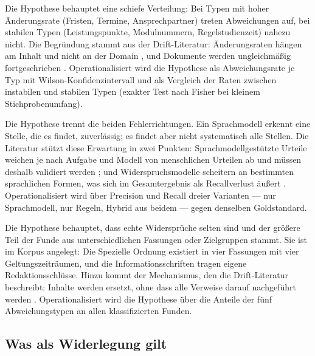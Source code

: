 \begin{description}[style=nextline]
  \item[H1 --- Abweichungen konzentrieren sich auf instabile Sachverhaltstypen]
  Die Hypothese behauptet eine schiefe Verteilung: Bei Typen mit hoher Änderungsrate
  (Fristen, Termine, Ansprechpartner) treten Abweichungen auf, bei stabilen Typen
  (Leistungspunkte, Modulnummern, Regelstudienzeit) nahezu nicht. Die Begründung stammt aus
  der Drift-Literatur: Änderungsraten hängen am Inhalt und nicht an der Domain
  \parencite{fetterly2003}, und Dokumente werden ungleichmäßig fortgeschrieben
  \parencite{jones2016}. Operationalisiert wird die Hypothese als Abweichungsrate je Typ mit
  Wilson-Konfidenzintervall und als Vergleich der Raten zwischen instabilen und stabilen
  Typen (exakter Test nach Fisher bei kleinem Stichprobenumfang).
  \item[H2 --- Sprachmodellgestützte Extraktion ist präzise, aber nicht vollständig]
  Die Hypothese trennt die beiden Fehlerrichtungen. Ein Sprachmodell erkennt eine Stelle, die
  es findet, zuverlässig; es findet aber nicht systematisch alle Stellen. Die Literatur
  stützt diese Erwartung in zwei Punkten: Sprachmodellgestützte Urteile weichen je nach
  Aufgabe und Modell von menschlichen Urteilen ab und müssen deshalb validiert werden
  \parencite{bavaresco2025llms}; und Widerspruchsmodelle scheitern an bestimmten sprachlichen
  Formen, was sich im Gesamtergebnis als Recallverlust äußert \parencite{pielka2022}.
  Operationalisiert wird über Precision und Recall dreier Varianten --- nur Sprachmodell, nur
  Regeln, Hybrid aus beidem --- gegen denselben Goldstandard.
  \item[H3 --- Die meisten Abweichungen sind Zeitartefakte]
  Die Hypothese behauptet, dass echte Widersprüche selten sind und der größere Teil der Funde
  aus unterschiedlichen Fassungen oder Zielgruppen stammt. Sie ist im Korpus angelegt: Die
  Spezielle Ordnung existiert in vier Fassungen mit vier Geltungszeiträumen, und die
  Informationsschriften tragen eigene Redaktionsschlüsse. Hinzu kommt der Mechanismus, den
  die Drift-Literatur beschreibt: Inhalte werden ersetzt, ohne dass alle Verweise darauf
  nachgeführt werden \parencite{klein2014,jones2016}. Operationalisiert wird die Hypothese
  über die Anteile der fünf Abweichungstypen an allen klassifizierten Funden.
\end{description}

\subsection{Was als Widerlegung gilt}

